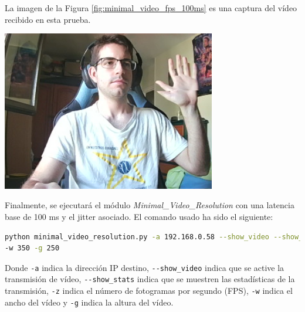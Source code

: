 \newpage
La imagen de la Figura \ref{fig:minimal_video_fps_100ms} es una captura del vídeo recibido en esta prueba.
\begin{center}
  \includegraphics[width = 0.7\textwidth]{images/VideoRecibido5.2.png}
  \label{fig:minimal_video_fps_100ms}
\end{center}

\newpage

Finalmente, se ejecutará el módulo \textit{Minimal\_Video\_Resolution} con una latencia base de 100 ms y el jitter asociado. El comando usado ha sido el siguiente:

\begin{lstlisting}[language=bash,basicstyle=\ttfamily\scriptsize]
python minimal_video_resolution.py -a 192.168.0.58 --show_video --show_stats -z 12 \\
-w 350 -g 250
\end{lstlisting}
Donde \verb|-a| indica la dirección IP destino, \verb|--show_video| indica que se active la transmisión de vídeo, \verb|--show_stats| indica que se muestren las estadísticas de la transmisión, \verb|-z| indica el número de fotogramas por segundo (FPS), \verb|-w| indica el ancho del vídeo y \verb|-g| indica la altura del vídeo.
\vspace{\baselineskip}

